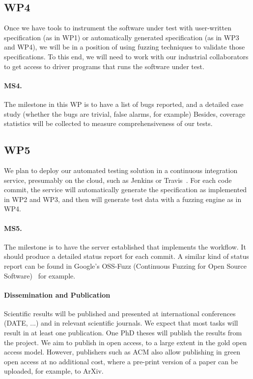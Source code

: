 \documentclass[fleqn,12pt]{article}
\begin{document}
\subsection{WP4} Once we have tools to instrument the software under test with user-written
specification (as in WP1) or automatically generated specification (as
in WP3 and WP4), we will be in a position of using fuzzing techniques
to validate those specifications. To this end, we will need to work
with our industrial collaborators to get access to driver programs
that runs the software under test. 

\paragraph{MS4.} The milestone in this WP is to have a list of bugs reported, and a detailed case study (whether the bugs are
trivial, false alarms, for example) Besides, coverage statistics will  be
collected to measure comprehensiveness of our tests. 

\subsection{WP5} We plan to deploy our automated testing solution  in a continuous
integration service, presumably on the cloud, such as Jenkins or
Travis~\cite{DBLP:journals/tse/GallabaM20}. For each code commit, the
service will automatically generate the specification as implemented
in WP2 and WP3, and then will generate test data with a fuzzing engine
as in WP4.

\paragraph{MS5.} The milestone is to have the server established that implements
the workflow. It should produce a detailed status report for each
commit.  A similar kind of status report can be found in Google's
OSS-Fuzz (Continuous Fuzzing for Open Source
Software)~\cite{web:oss-fuzz} for example.


\paragraph*{Dissemination and Publication}

Scientific results will be published and presented at international
conferences (DATE, ...) and in relevant scientific journals.
We expect that most tasks will result in at least one publication.
One PhD theses will publish the results from the project.
We aim to publish in open access, to a large extent in the gold open access model.
However, publishers such as ACM also allow publishing in green open access
at no additional cost, where a pre-print version of a paper can be uploaded,
for example, to ArXiv.
\end{document}
